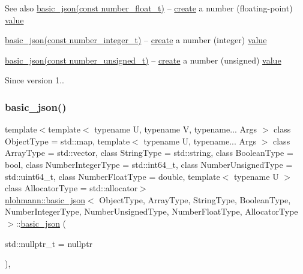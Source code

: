 \begin{DoxySeeAlso}{See also}
\hyperlink{classnlohmann_1_1basic__json_a2badcf191deabf579abcf8d3654da26f}{basic\+\_\+json(const number\+\_\+float\+\_\+t)} -- \hyperlink{classnlohmann_1_1basic__json_afdb7a485369fbfd8c4c7c134ebb1feb5}{create} a number (floating-\/point) \hyperlink{classnlohmann_1_1basic__json_a407e73a037e6e3067ef7aa2c25a79f39}{value} 

\hyperlink{classnlohmann_1_1basic__json_a0d838bc7ffca6017f51167e0a8ffd9b6}{basic\+\_\+json(const number\+\_\+integer\+\_\+t)} -- \hyperlink{classnlohmann_1_1basic__json_afdb7a485369fbfd8c4c7c134ebb1feb5}{create} a number (integer) \hyperlink{classnlohmann_1_1basic__json_a407e73a037e6e3067ef7aa2c25a79f39}{value} 

\hyperlink{classnlohmann_1_1basic__json_a85b09b03916d3d1e73373f49cdd4136d}{basic\+\_\+json(const number\+\_\+unsigned\+\_\+t)} -- \hyperlink{classnlohmann_1_1basic__json_afdb7a485369fbfd8c4c7c134ebb1feb5}{create} a number (unsigned) \hyperlink{classnlohmann_1_1basic__json_a407e73a037e6e3067ef7aa2c25a79f39}{value}
\end{DoxySeeAlso}
\begin{DoxySince}{Since}
version 1.. 
\end{DoxySince}
\hypertarget{classnlohmann_1_1basic__json_aa7ad0ebda83e54c22ba8b3d954ef1293}{}\label{classnlohmann_1_1basic__json_aa7ad0ebda83e54c22ba8b3d954ef1293} 
\subsubsection{\texorpdfstring{basic\+\_\+json()}{basic\_json()}\hspace{0.1cm}{\footnotesize\ttfamily [2/23]}}
{\footnotesize\ttfamily template$<$template$<$ typename U, typename V, typename... Args $>$ class Object\+Type = std\+::map, template$<$ typename U, typename... Args $>$ class Array\+Type = std\+::vector, class String\+Type  = std\+::string, class Boolean\+Type  = bool, class Number\+Integer\+Type  = std\+::int64\+\_\+t, class Number\+Unsigned\+Type  = std\+::uint64\+\_\+t, class Number\+Float\+Type  = double, template$<$ typename U $>$ class Allocator\+Type = std\+::allocator$>$ \\
\hyperlink{classnlohmann_1_1basic__json}{nlohmann\+::basic\+\_\+json}$<$ Object\+Type, Array\+Type, String\+Type, Boolean\+Type, Number\+Integer\+Type, Number\+Unsigned\+Type, Number\+Float\+Type, Allocator\+Type $>$\+::\hyperlink{classnlohmann_1_1basic__json}{basic\+\_\+json} (\begin{DoxyParamCaption}\item[{std\+::nullptr\+\_\+t}]{ = {\ttfamily nullptr} }\end{DoxyParamCaption})\hspace{0.3cm}{\ttfamily [inline]}, {\ttfamily [noexcept]}}



